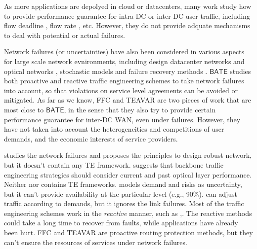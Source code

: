 \documentclass[sigconf]{acmart}
\begin{document}
As more applications are depolyed in cloud or datacenters, 
many work study how to provide performance guarantee for intra-DC or inter-DC user traffic, 
including flow deadline \cite{D2TCP, LPD, Guaranteeings},  flow rate \cite{appdriven, EyeQ}, etc.
However, they do not provide adquate mechanisms to deal with potential or actual failures. 

Network failures (or uncertainties) have also been considered in various aspects for large scale network evnironments, including design datacenter networks \cite{evole} and optical networks \cite{Optical},  
stochastic models \cite{Stochastic} \cite{bi2019uncertainty-aware}
and failure recovery methods \cite{jointfailure, R3}. 
$\mathsf{BATE}$ studies both proactive and reactive traffic engineering schemes to 
take network failures into account, so that violations on service level agreements can be avoided or mitigated. 
As far as we know, FFC \cite{FFC} and TEAVAR \cite{Teavar} are two pieces of work that are 
most close to $\mathsf{BATE}$, 
in the sense that they also try to provide certain performance guarantee for inter-DC WAN, even under failures. 
However, they have not taken into account the heterogeneities and competitions of user demands, 
and the economic interests of service providers. 


\iffalse
\cite{evole} studies the network failures and proposes the principles to design robust network, but it doesn't contain any TE framework.
\cite{Optical} suggests that backbone traffic engineering strategies should consider current and past optical layer performance.
Neither \cite{evole} nor \cite{Optical} contains TE frameworks.
 \cite{Stochastic} models demand and risks as uncertainty, but it can't provide availability at the particular level (e.g., 90\%).
 \cite{bi2019uncertainty-aware} can adjust traffic according to demands, but it ignores the link failures.
 Most of the traffic engineering schemes work in the \textit{reactive} manner, such as \cite{jointfailure},\cite{R3}.
The reactive methods could take a long time to recover from faults, while applications have already been hurt\cite{FFC}.
FFC \cite{FFC} and TEAVAR\cite{Teavar} are proactive routing protection methods, but they can't ensure the resources of services under network failures.

\end{document}
